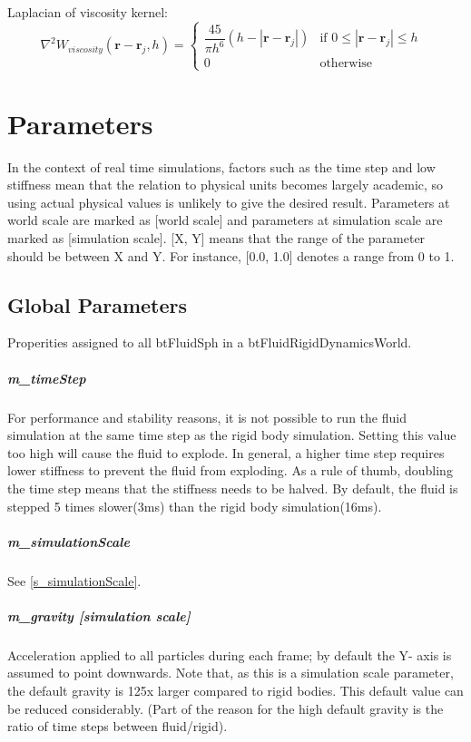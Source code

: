 \documentclass[]{article}
\begin{document}
	Laplacian of viscosity kernel:
	\begin{equation}
		\nabla ^ 2 W_{viscosity}(\mathbf{r} - \mathbf{r}_j, h) =  
						\left \{ 
							\begin{array}{ll}
								\dfrac{45}{\pi h^6} (h - |\mathbf{r} - \mathbf{r}_j|)
									& \textrm{if \(0 \leq |\mathbf{r} - \mathbf{r}_j| \leq h\) } \\[1em]
								0 & \textrm{otherwise} 
							\end{array}
						\right.
	\end{equation}
	
\pagebreak
\section{Parameters}
	In the context of real time simulations, factors such as the time step and low stiffness mean that the relation to
	physical units becomes largely academic, so using actual physical values is unlikely to give the desired result. 
	Parameters at world scale are marked as [world scale] and parameters at simulation scale are marked as 
	[simulation scale]. [X, Y] means that the range of the parameter should be between X and Y. For instance, [0.0, 1.0]
	denotes a range from 0 to 1.
	
	\subsection{Global Parameters}
		Properities assigned to all btFluidSph in a btFluidRigidDynamicsWorld.
	
		\subparagraph{m\_timeStep}
			For performance and stability reasons, it is not possible to run the fluid simulation at the same time step as 
			the rigid body simulation. Setting this value too high will cause the fluid to explode. In general, a higher 
			time step requires lower stiffness to prevent the fluid from exploding. As a rule of thumb, doubling the time step
			means that the stiffness needs to be halved. By default, the fluid is stepped 5 times slower(3ms) than the rigid body simulation(16ms).
		
		\subparagraph{m\_simulationScale}
			See \ref{s_simulationScale}.
		
		\subparagraph{m\_gravity [simulation scale] }
			Acceleration applied to all particles during each frame; by default the Y- axis is assumed to point downwards.
			Note that, as this is a simulation scale parameter, the default gravity is 125x larger compared to rigid bodies. 
			This default value can be reduced considerably. (Part of the reason for the high default gravity is the ratio of 
			time steps between fluid/rigid).
		
\end{document}
